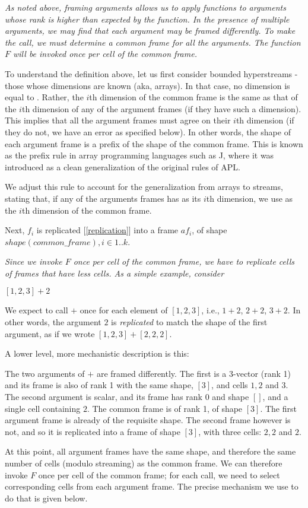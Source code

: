 \documentclass{article}
\begin{document}
{\em
As noted above, framing arguments allows us to apply functions to arguments whose rank is higher than expected by the function. In the presence of multiple arguments,
we may find that each argument may be framed differently. To make the call, we must determine a common frame for all the arguments. The function $F$ will be 
invoked once per cell of the common frame.  

To understand the definition above, let us first consider bounded hyperstreams - those whose dimensions are known (aka, arrays).
In that case, no dimension is equal to \QUESTIONMARK{}. Rather, the $i$th dimension of the common frame is the same as that of the $i$th dimension of any of the argument frames (if they have such a dimension).  This implies that all the argument frames must agree on their $i$th dimension (if they do not, we have an error as specified below).
In other words, the shape of each argument frame is a prefix of the shape of the common frame. This is known as the prefix rule in array programming languages such as J,  where it was introduced as a clean generalization of the original rules of APL.

We adjust this rule to account for the generalization from arrays to streams, 
stating that, if any of the arguments frames has \QUESTIONMARK{} as its $i$th dimension, we use \QUESTIONMARK{} as the $i$th dimension of the common frame.
}

Next, $f_i$ is replicated [\ref{replication}] into a frame $af_i$, of shape $shape(common\_frame), i \in 1..k$. 

{\em
Since we invoke $F$ once per cell of the common frame, we have to replicate cells of frames that have less cells.
As a simple example, consider

$[1, 2, 3] + 2$

We expect to call $+$ once for each element of $[1, 2, 3]$, i.e., $1+2$, $2+2$, $3+2$. In other words, the argument $2$ is {\em replicated} to match the shape of the first argument, as if we wrote $[1, 2, 3] + [2, 2, 2]$.

A lower level, more mechanistic  description is this:

The two arguments of $+$ are framed differently. The first is a 3-vector (rank 1) and its frame is also of rank 1 with the same shape, $[3]$, and cells $1, 2$ and $3$.
The second argument is  scalar,  and its frame has rank 0 and shape $[]$, and a single cell containing $2$. The common frame is of rank 1, of shape $[3]$. The first argument frame is already of the requisite shape. The second frame however is not, and so it is replicated into a frame of shape $[3]$, with three cells: $2, 2$ and $2$.

At this point, all argument frames have the same shape, and therefore the same number of cells (modulo streaming) as the common frame. We can therefore invoke $F$ once per cell of the common frame;  for each call, we need to select corresponding cells from each argument frame. The precise mechanism we use to do that is given below. 
}
\end{document}
